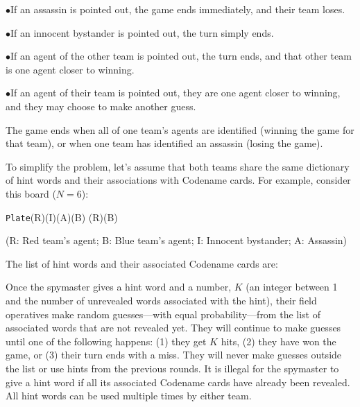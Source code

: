 {\parskip=0pt
\item{$\bullet$}If an assassin is pointed out, the game ends immediately, and their team loses.
\item{$\bullet$}If an innocent bystander is pointed out, the turn simply ends.
\item{$\bullet$}If an agent of the other team is pointed out, the turn ends, and that other team is one agent closer to winning.
\item{$\bullet$}If an agent of their team is pointed out, they are one agent closer to winning, and they may choose to make another guess.
}
\par
The game ends when all of one team's agents are identified (winning
the game for that team), or when one team has identified an assassin
(losing the game).
\par
To simplify the problem, let's assume that both teams share the same
dictionary of hint words and their associations with Codename
cards. For example, consider this board ($N = 6$):
\par
{\tt Plate}(R)(I)(A)(B)
(R)(B)
{\parskip=0pt \par
(R: Red team's agent; B: Blue team's agent; I: Innocent bystander; A: Assassin)}
\par
The list of hint words and their associated Codename cards are:
\smallskip
\hbox { \hfil}
\vfill \eject \continuedheader \par
Once the spymaster gives a hint word and a number, $K$ (an integer
between 1 and the number of unrevealed words associated with the hint), their field
operatives make random guesses---with equal probability---from the
list of associated words that are not revealed yet. They will
continue to make guesses until one of the following happens: (1) they
get $K$ hits, (2) they have won the game, or (3) their turn ends with
a miss. They will never make guesses outside the list or use hints
from the previous rounds. It is illegal for the spymaster to give a
hint word if all its associated Codename cards have already been
revealed. All hint words can be used multiple times by either team.
